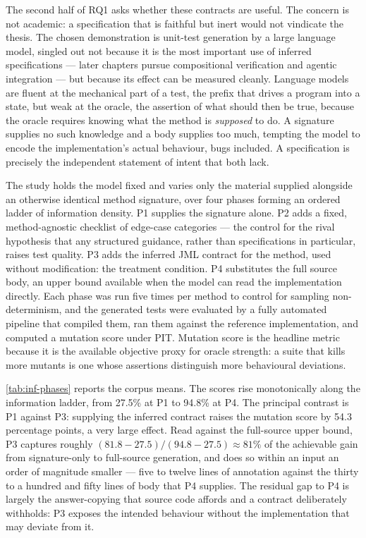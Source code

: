 The second half of RQ1 asks whether these contracts are useful. The concern is not
academic: a specification that is faithful but inert would not vindicate the thesis.
The chosen demonstration is unit-test generation by a large language model, singled
out not because it is the most important use of inferred specifications --- later
chapters pursue compositional verification and agentic integration --- but because
its effect can be measured cleanly. Language models are fluent at the mechanical
part of a test, the prefix that drives a program into a state, but weak at the
oracle, the assertion of what should then be true, because the oracle requires
knowing what the method is \emph{supposed} to do. A signature supplies no such
knowledge and a body supplies too much, tempting the model to encode the
implementation's actual behaviour, bugs included. A specification is precisely the
independent statement of intent that both lack.

The study holds the model fixed and varies only the material supplied alongside an
otherwise identical method signature, over four phases forming an ordered ladder of
information density. P1 supplies the signature alone. P2 adds a fixed,
method-agnostic checklist of edge-case categories --- the control for the rival
hypothesis that any structured guidance, rather than specifications in particular,
raises test quality. P3 adds the inferred JML contract for the method, used without
modification: the treatment condition. P4 substitutes the full source body, an
upper bound available when the model can read the implementation directly. Each
phase was run five times per method to control for sampling non-determinism, and the
generated tests were evaluated by a fully automated pipeline that compiled them, ran
them against the reference implementation, and computed a mutation score under PIT.
Mutation score is the headline metric because it is the available objective proxy
for oracle strength: a suite that kills more mutants is one whose assertions
distinguish more behavioural deviations.

\cref{tab:inf-phases} reports the corpus means. The scores rise monotonically along
the information ladder, from 27.5\% at P1 to 94.8\% at P4. The principal contrast is
P1 against P3: supplying the inferred contract raises the mutation score by 54.3
percentage points, a very large effect. Read against the full-source upper bound,
P3 captures roughly $(81.8 - 27.5)/(94.8 - 27.5) \approx 81\%$ of the achievable
gain from signature-only to full-source generation, and does so within an input an
order of magnitude smaller --- five to twelve lines of annotation against the thirty
to a hundred and fifty lines of body that P4 supplies. The residual gap to P4 is
largely the answer-copying that source code affords and a contract deliberately
withholds: P3 exposes the intended behaviour without the implementation that may
deviate from it.

